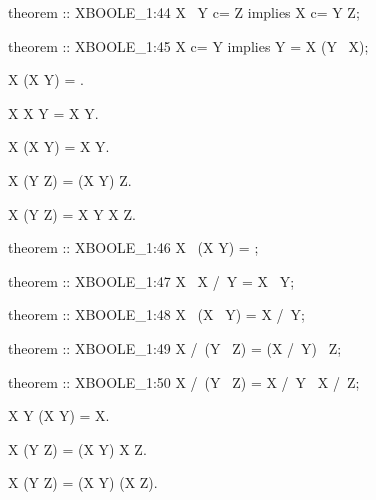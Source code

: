 \begin{paracol}{2}
\begin{mizar}
theorem :: XBOOLE_1:44
  X \ Y c= Z implies X c= Y \/ Z;

theorem :: XBOOLE_1:45
  X c= Y implies Y = X \/ (Y \ X);
\end{mizar}

\switchcolumn*\ensurevspace{5cm}

\begin{theorem}
  X \setminus (X \cup Y) = \emptyset.
\end{theorem}

\begin{theorem}
  X \setminus X \cap Y = X \setminus Y.
\end{theorem}

\begin{theorem}
  X \setminus (X \setminus Y) = X \cap Y.
\end{theorem}

\begin{theorem}
  X \cap (Y \setminus Z) = (X \cap Y) \setminus Z.
\end{theorem}

\begin{theorem}
  X \cap (Y \setminus Z) = X \cap Y \setminus X \cap Z.
\end{theorem}

\switchcolumn

\begin{mizar}
theorem :: XBOOLE_1:46
  X \ (X \/ Y) = {};

theorem :: XBOOLE_1:47
  X \ X /\ Y = X \ Y;

theorem :: XBOOLE_1:48
  X \ (X \ Y) = X /\ Y;

theorem :: XBOOLE_1:49
  X /\ (Y \ Z) = (X /\ Y) \ Z;

theorem :: XBOOLE_1:50
  X /\ (Y \ Z) = X /\ Y \ X /\ Z;
\end{mizar}

\switchcolumn*\ensurevspace{5cm}

\begin{theorem}
  X \cap Y \cup (X \setminus Y) = X.
\end{theorem}

\begin{theorem}
  X \setminus (Y \setminus Z) = (X \setminus Y) \cup X \cap Z.
\end{theorem}

\begin{theorem}
  X \setminus (Y \cup Z) = (X \setminus Y) \cap (X \setminus Z).
\end{theorem}


\end{paracol}
